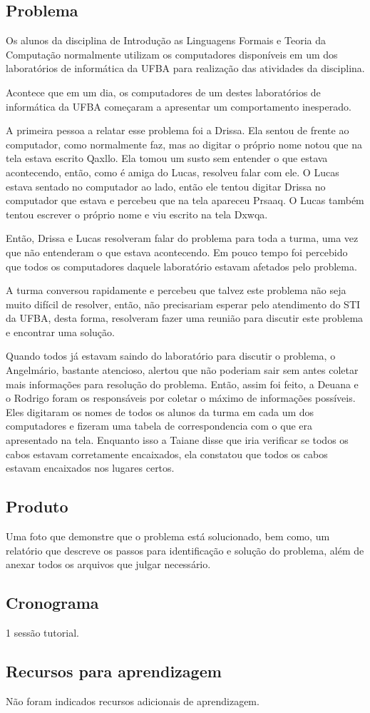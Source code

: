 \subsection{Problema}
Os alunos da disciplina de Introdução as Linguagens Formais e Teoria da Computação normalmente
utilizam os computadores disponíveis em um dos laboratórios de informática da UFBA para
realização das atividades da disciplina.

Acontece que em um dia, os computadores de um destes laboratórios
de informática da UFBA começaram a apresentar um comportamento inesperado.

A primeira pessoa a relatar esse problema foi a Drissa.
Ela sentou de frente ao computador, como normalmente faz, mas ao digitar o próprio nome notou
que na tela estava escrito Qaxllo.
Ela tomou um susto sem entender o que estava acontecendo, então, como é amiga do Lucas, resolveu falar
com ele.
O Lucas estava sentado no computador ao lado, então ele tentou digitar Drissa no computador
que estava e percebeu que na tela apareceu Prsaaq.
O Lucas também tentou escrever o próprio nome e viu escrito na tela Dxwqa.

Então, Drissa e Lucas resolveram falar do problema para toda a turma, uma vez que não entenderam o
que estava acontecendo.
Em pouco tempo foi percebido que todos os computadores daquele laboratório estavam afetados
pelo problema.

A turma conversou rapidamente e percebeu que talvez este problema não seja muito difícil de resolver, então,
não precisariam esperar pelo atendimento do STI da UFBA, desta forma, resolveram fazer uma reunião para
discutir este problema e encontrar uma solução.

Quando todos já estavam saindo do laboratório para discutir o problema, o Angelmário, bastante atencioso,
alertou que não poderiam sair sem antes coletar mais informações para resolução do problema.
Então, assim foi feito, a Deuana e o Rodrigo foram os responsáveis por coletar o máximo de informações
possíveis.
Eles digitaram os nomes de todos os alunos da turma em cada um dos computadores e fizeram uma tabela de
correspondencia com o que era apresentado na tela.
Enquanto isso a Taiane disse que iria verificar se todos os cabos estavam
corretamente encaixados, ela constatou que todos os cabos estavam encaixados nos lugares certos.

\subsection{Produto}
Uma foto que demonstre que o problema está solucionado, bem como, um relatório que descreve os passos
para identificação e solução do problema, além de anexar todos os arquivos que julgar necessário.

\subsection{Cronograma}

1 sessão tutorial.

\subsection{Recursos para aprendizagem}
Não foram indicados recursos adicionais de aprendizagem.
